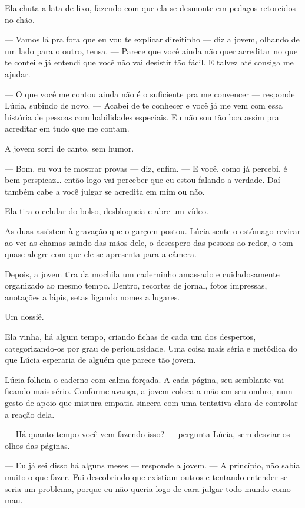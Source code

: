 Ela chuta a lata de lixo, fazendo com que ela se desmonte em pedaços retorcidos no chão.

— Vamos lá pra fora que eu vou te explicar direitinho — diz a jovem, olhando de um lado para o outro, tensa. — Parece que você ainda não quer acreditar no que te contei e já entendi que você não vai desistir tão fácil. E talvez até consiga me ajudar.

— O que você me contou ainda não é o suficiente pra me convencer — responde Lúcia, subindo de novo. — Acabei de te conhecer e você já me vem com essa história de pessoas com habilidades especiais.  
Eu não sou tão boa assim pra acreditar em tudo que me contam.

A jovem sorri de canto, sem humor.

— Bom, eu vou te mostrar provas — diz, enfim. — E você, como já percebi, é bem perspicaz… então logo vai perceber que eu estou falando a verdade.  
Daí também cabe a você julgar se acredita em mim ou não.

Ela tira o celular do bolso, desbloqueia e abre um vídeo.

As duas assistem à gravação que o garçom postou.  
Lúcia sente o estômago revirar ao ver as chamas saindo das mãos dele, o desespero das pessoas ao redor, o tom quase alegre com que ele se apresenta para a câmera.

Depois, a jovem tira da mochila um caderninho amassado e cuidadosamente organizado ao mesmo tempo.
Dentro, recortes de jornal, fotos impressas, anotações a lápis, setas ligando nomes a lugares.

Um dossiê.

Ela vinha, há algum tempo, criando fichas de cada um dos despertos, categorizando-os por grau de periculosidade.  
Uma coisa mais séria e metódica do que Lúcia esperaria de alguém que parece tão jovem.

Lúcia folheia o caderno com calma forçada.  
A cada página, seu semblante vai ficando mais sério.  
Conforme avança, a jovem coloca a mão em seu ombro, num gesto de apoio que mistura empatia sincera com uma tentativa clara de controlar a reação dela.

— Há quanto tempo você vem fazendo isso? — pergunta Lúcia, sem desviar os olhos das páginas.

— Eu já sei disso há alguns meses — responde a jovem. — A princípio, não sabia muito o que fazer.
Fui descobrindo que existiam outros e tentando entender se seria um problema, porque eu não queria logo de cara julgar todo mundo como mau.

